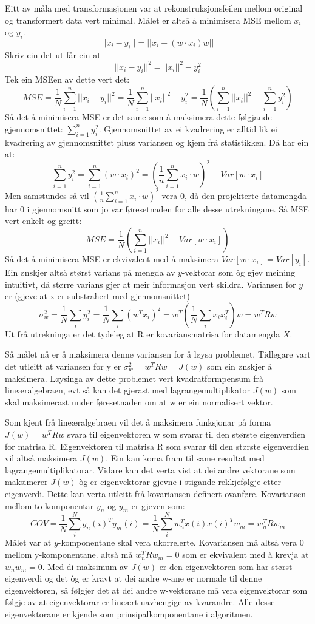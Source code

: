 \documentclass[oneside, nynorsk]{book}
\begin{document}
Eitt av måla med transformasjonen var at rekonstruksjonsfeilen mellom original og transformert data vert minimal.
Målet er altså å minimisera MSE mellom $x_i$ og $y_i$.
\[||x_i-y_i||=||x_i-(w\cdot x_i)w||\]
Skriv ein det ut får ein at
\[||x_i-y_i||^2=||x_i||^2-y_i^2\]
Tek ein MSEen av dette vert det:
\[MSE=\frac{1}{N}\sum_{i=1}^n ||x_i-y_i||^2=\frac{1}{N}\sum_{i=1}^n ||x_i||^2-y_i^2=\frac{1}{N}\left(\sum_{i=1}^n ||x_i||^2 - \sum_{i=1}^n y_i^2\right)\]
Så det å minimisera MSE er det same som å maksimera dette følgjande gjennomsnittet: $\sum_{i=1}^n y_i^2$.
Gjennomsnittet av ei kvadrering er alltid lik ei kvadrering av gjennomsnittet pluss variansen og kjem frå statistikken.
Då har ein at:
\[\sum_{i=1}^n y_i^2=\sum_{i=1}^n (w\cdot x_i)^2=\left(\frac{1}{n}\sum_{i=1}^n x_i \cdot w \right)^2+Var[w\cdot x_i]\]
Men samstundes så vil $\left(\frac{1}{n}\sum_{i=1}^n x_i \cdot w \right)^2$ vera 0, då den projekterte datamengda har 0 i gjennomsnitt som jo
var føresetnaden for alle desse utrekningane. Så MSE vert enkelt og greitt:
\[MSE=\frac{1}{N}\left(\sum_{i=1}^n ||x_i||^2 - Var[w\cdot x_i]\right)\]
Så det å minimisera MSE er ekvivalent med å maksimera $Var[w\cdot x_i]=Var[y_i]$.
Ein ønskjer altså størst varians på mengda av $y$-vektorar som òg gjev meining intuitivt, då større varians gjer at meir informasjon vert skildra.
Variansen for $y$ er (gjeve at x er substrahert med gjennomsnittet)
\[\sigma_w^2=\frac{1}{N}\sum_{i}y_i^2=\frac{1}{N}\sum_{i}(w^Tx_i)^2=w^T(\frac{1}{N}\sum_{i}x_ix_i^T)w=w^TRw\]
Ut frå utrekninga er det tydeleg at R er kovariansmatrisa for datamengda $X$.

Så målet nå er å maksimera denne variansen for å løysa problemet. Tidlegare vart det utleitt at variansen for y er
$\sigma_w^2=w^TRw=J(w)$ som ein ønskjer å maksimera. Løysinga av dette problemet vert kvadratformpensum frå lineæralgebraen,
evt så kan det gjerast med lagrangemultiplikator $J(w)$ som skal maksimerast under føresetnaden om at w er ein normalisert vektor.

Som kjent frå lineæralgebraen vil det å maksimera funksjonar på forma $J(w)=w^TRw$ svara til eigenvektoren w som svarar til den største eigenverdien for matrisa R.
Eigenvektoren til matrisa R som svarar til den største eigenverdien vil altså maksimera $J(w)$. Ein kan koma fram til same resultat med lagrangemultiplikatorar.
Vidare kan det verta vist at dei andre vektorane som maksimerer $J(w)$ òg er eigenvektorar gjevne i stigande rekkjefølgje etter eigenverdi.
Dette kan verta utleitt frå kovariansen definert ovanføre.
Kovariansen mellom to komponentar $y_n$ og $y_m$ er gjeven som:
\[COV=\frac{1}{N}\sum_{i}^Ny_n(i)^Ty_m(i)=\frac{1}{N}\sum_{i}^Nw_n^Tx(i)x(i)^Tw_m=w_n^TRw_m\]
Målet var at $y$-komponentane skal vera ukorrelerte. Kovariansen må altså vera 0 mellom y-komponentane. altså må $w_n^TRw_m=0$ som er ekvivalent med å krevja at
$w_nw_m=0$. Med di maksimum av $J(w)$ er den eigenvektoren som har størst eigenverdi og det òg er kravt at dei andre w-ane er normale til denne eigenvektoren, så følgjer det at
dei andre w-vektorane må vera eigenvektorar som følgje av at eigenvektorar er lineært uavhengige av kvarandre.
Alle desse eigenvektorane er kjende som prinsipalkomponentane i algoritmen.
\end{document}
